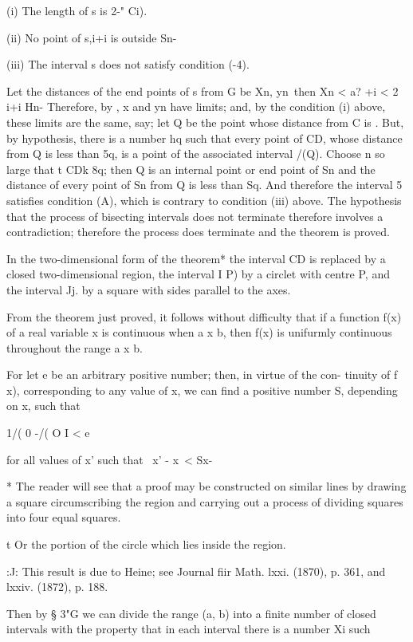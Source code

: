 (i) The length of s is 2-" Ci).

(ii) No point of s,i+i is outside Sn-

(iii) The interval s does not satisfy condition (-4).

Let the distances of the end points of s from G be Xn, yn\ then Xn <
a? +i < 2 i+i Hn- Therefore, by , x and yn have limits; and, by
the condition (i) above, these limits are the same, say; let Q be the
point whose distance from C is . But, by hypothesis, there is a number
hq such that every point of CD, whose distance from Q is less than 5q,
is a point of the associated interval /(Q). Choose n so large that t
CDk 8q; then Q is an internal point or end point of Sn and the
distance of every point of Sn from Q is less than Sq. And therefore
the interval 5 satisfies condition (A), which is contrary to condition
(iii) above. The hypothesis that the process of bisecting intervals
does not terminate therefore involves a contradiction; therefore the
process does terminate and the theorem is proved.

In the two-dimensional form of the theorem* the interval CD is
replaced by a closed two-dimensional region, the interval I P) by a
circlet with centre P, and the interval Jj. by a square with sides
parallel to the axes.


From the theorem just proved, it follows without difficulty that if a
function f(x) of a real variable x is continuous when a x b, then f(x)
is unifurmly continuous throughout the range a x b.

For let e be an arbitrary positive number; then, in virtue of the
con- tinuity of f x), corresponding to any value of x, we can find a
positive number S, depending on x, such that

1/( 0 -/( O I < e

for all values of x' such that \ x' - x\ < Sx-

* The reader will see that a proof may be constructed on similar lines
by drawing a square circumscribing the region and carrying out a
process of dividing squares into four equal squares.

t Or the portion of the circle which lies inside the region.

:J: This result is due to Heine; see Journal fiir Math. lxxi. (1870),
p. 361, and lxxiv. (1872), p. 188.

%
%

Then by § 3"G we can divide the range (a, b) into a finite number of
closed intervals with the property that in each interval there is a
number Xi such

